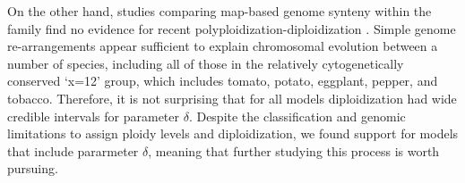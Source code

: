 On the other hand, studies comparing map-based genome synteny within the family find no evidence for recent polyploidization-diploidization \citep{wu_2010a}. 
Simple genome re-arrangements appear sufficient to explain chromosomal evolution between a number of species, including all of those in the relatively cytogenetically conserved `x=12' group, which includes tomato, potato, eggplant, pepper, and tobacco.
Therefore, it is not surprising that for all models diploidization  had wide credible intervals for parameter $\delta$. Despite the classification and genomic limitations to assign ploidy levels and diploidization, we found support for models that include pararmeter $\delta$, meaning that further studying this process is worth pursuing.



%

